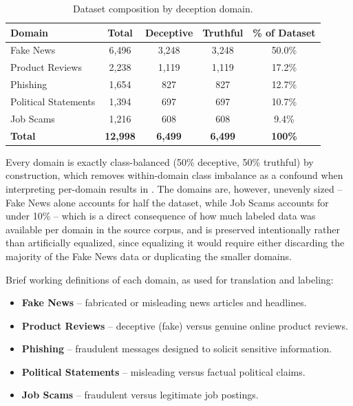 \begin{table}[htbp]
\centering
\caption{Dataset composition by deception domain.}
\label{tab:dataset-domains}
\begin{tabular}{@{}lcccc@{}}
\toprule
\textbf{Domain} & \textbf{Total} & \textbf{Deceptive} & \textbf{Truthful} & \textbf{\% of Dataset} \\
\midrule
Fake News             & 6{,}496 & 3{,}248 & 3{,}248 & 50.0\% \\
Product Reviews       & 2{,}238 & 1{,}119 & 1{,}119 & 17.2\% \\
Phishing              & 1{,}654 &   827   &   827   & 12.7\% \\
Political Statements  & 1{,}394 &   697   &   697   & 10.7\% \\
Job Scams             & 1{,}216 &   608   &   608   &  9.4\% \\
\midrule
\textbf{Total}         & \textbf{12{,}998} & \textbf{6{,}499} & \textbf{6{,}499} & \textbf{100\%} \\
\bottomrule
\end{tabular}
\end{table}

Every domain is exactly class-balanced (50\% deceptive, 50\% truthful) by construction, which removes within-domain class imbalance as a confound when interpreting per-domain results in . The domains are, however, unevenly sized -- Fake News alone accounts for half the dataset, while Job Scams accounts for under 10\% -- which is a direct consequence of how much labeled data was available per domain in the source corpus, and is preserved intentionally rather than artificially equalized, since equalizing it would require either discarding the majority of the Fake News data or duplicating the smaller domains.

Brief working definitions of each domain, as used for translation and labeling:
\begin{itemize}
    \item \textbf{Fake News} -- fabricated or misleading news articles and headlines.
    \item \textbf{Product Reviews} -- deceptive (fake) versus genuine online product reviews.
    \item \textbf{Phishing} -- fraudulent messages designed to solicit sensitive information.
    \item \textbf{Political Statements} -- misleading versus factual political claims.
    \item \textbf{Job Scams} -- fraudulent versus legitimate job postings.
\end{itemize}

